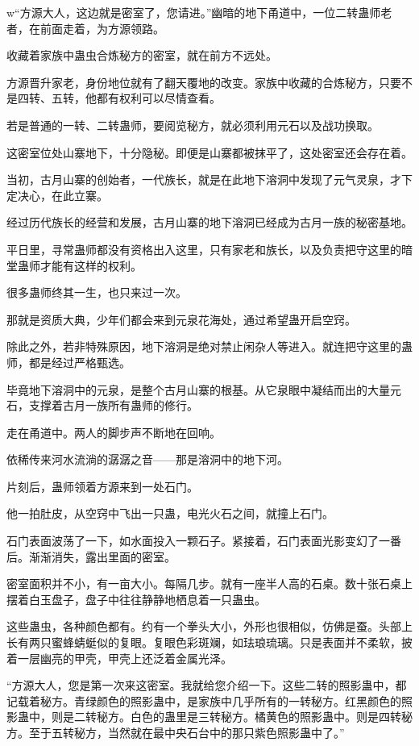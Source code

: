 
\begin{this_body}

w“方源大人，这边就是密室了，您请进。”幽暗的地下甬道中，一位二转蛊师老者，在前面走着，为方源领路。

收藏着家族中蛊虫合炼秘方的密室，就在前方不远处。

方源晋升家老，身份地位就有了翻天覆地的改变。家族中收藏的合炼秘方，只要不是四转、五转，他都有权利可以尽情查看。

若是普通的一转、二转蛊师，要阅览秘方，就必须利用元石以及战功换取。

这密室位处山寨地下，十分隐秘。即便是山寨都被抹平了，这处密室还会存在着。

当初，古月山寨的创始者，一代族长，就是在此地下溶洞中发现了元气灵泉，才下定决心，在此立寨。

经过历代族长的经营和发展，古月山寨的地下溶洞已经成为古月一族的秘密基地。

平日里，寻常蛊师都没有资格出入这里，只有家老和族长，以及负责把守这里的暗堂蛊师才能有这样的权利。

很多蛊师终其一生，也只来过一次。

那就是资质大典，少年们都会来到元泉花海处，通过希望蛊开启空窍。

除此之外，若非特殊原因，地下溶洞是绝对禁止闲杂人等进入。就连把守这里的蛊师，都是经过严格甄选。

毕竟地下溶洞中的元泉，是整个古月山寨的根基。从它泉眼中凝结而出的大量元石，支撑着古月一族所有蛊师的修行。

走在甬道中。两人的脚步声不断地在回响。

依稀传来河水流淌的潺潺之音——那是溶洞中的地下河。

片刻后，蛊师领着方源来到一处石门。

他一拍肚皮，从空窍中飞出一只蛊，电光火石之间，就撞上石门。

石门表面波荡了一下，如水面投入一颗石子。紧接着，石门表面光影变幻了一番后。渐渐消失，露出里面的密室。

密室面积并不小，有一亩大小。每隔几步。就有一座半人高的石桌。数十张石桌上摆着白玉盘子，盘子中往往静静地栖息着一只蛊虫。

这些蛊虫，各种颜色都有。约有一个拳头大小，外形也很相似，仿佛是蚕。头部上长有两只蜜蜂蜻蜓似的复眼。复眼色彩斑斓，如珐琅琉璃。只是表面并不柔软，披着一层幽亮的甲壳，甲壳上还泛着金属光泽。

“方源大人，您是第一次来这密室。我就给您介绍一下。这些二转的照影蛊中，都记载着秘方。青绿颜色的照影蛊中，是家族中几乎所有的一转秘方。红黑颜色的照影蛊中，则是二转秘方。白色的蛊里是三转秘方。橘黄色的照影蛊中。则是四转秘方。至于五转秘方，当然就在最中央石台中的那只紫色照影蛊中了。”


\end{this_body}

